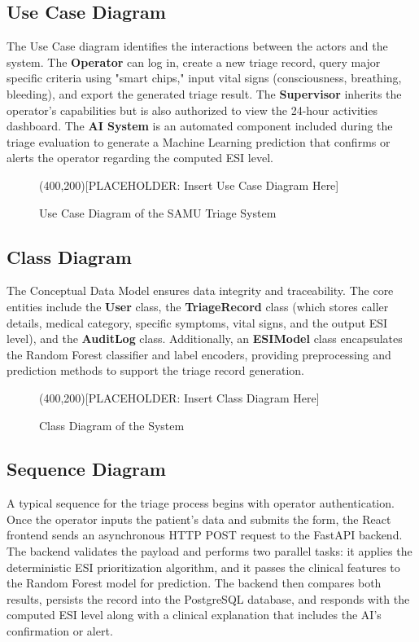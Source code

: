 \documentclass[a4paper,12pt,oneside]{report}
\begin{document}
\subsection{Use Case Diagram}
The Use Case diagram identifies the interactions between the actors and the system. The \textbf{Operator} can log in, create a new triage record, query major specific criteria using "smart chips," input vital signs (consciousness, breathing, bleeding), and export the generated triage result. The \textbf{Supervisor} inherits the operator's capabilities but is also authorized to view the 24-hour activities dashboard. The \textbf{AI System} is an automated component included during the triage evaluation to generate a Machine Learning prediction that confirms or alerts the operator regarding the computed ESI level.

\begin{figure}[H]
\centering
\framebox(400,200){[PLACEHOLDER: Insert Use Case Diagram Here]}
\caption{Use Case Diagram of the SAMU Triage System}
\label{fig:usecase}
\end{figure}

\subsection{Class Diagram}
The Conceptual Data Model ensures data integrity and traceability. The core entities include the \textbf{User} class, the \textbf{TriageRecord} class (which stores caller details, medical category, specific symptoms, vital signs, and the output ESI level), and the \textbf{AuditLog} class. Additionally, an \textbf{ESIModel} class encapsulates the Random Forest classifier and label encoders, providing preprocessing and prediction methods to support the triage record generation.

\begin{figure}[H]
\centering
\framebox(400,200){[PLACEHOLDER: Insert Class Diagram Here]}
\caption{Class Diagram of the System}
\label{fig:class}
\end{figure}

\subsection{Sequence Diagram}
A typical sequence for the triage process begins with operator authentication. Once the operator inputs the patient's data and submits the form, the React frontend sends an asynchronous HTTP POST request to the FastAPI backend. The backend validates the payload and performs two parallel tasks: it applies the deterministic ESI prioritization algorithm, and it passes the clinical features to the Random Forest model for prediction. The backend then compares both results, persists the record into the PostgreSQL database, and responds with the computed ESI level along with a clinical explanation that includes the AI's confirmation or alert. 
\end{document}
